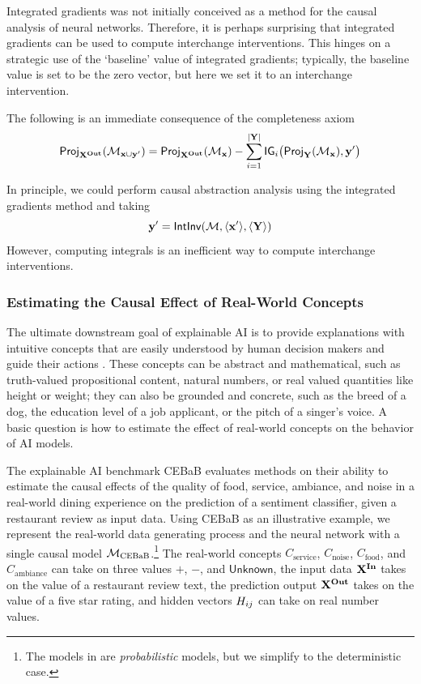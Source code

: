 \documentclass[twoside,11pt]{article}
\begin{document}
Integrated gradients was not initially conceived as a method for the causal analysis of neural networks. Therefore, it is perhaps surprising that integrated gradients can be used to compute interchange interventions. This hinges on a strategic use of the `baseline' value of integrated gradients; typically, the baseline value is set to be the zero vector, but here we set it to an interchange intervention. 
\begin{remark}

The following is an immediate consequence of the completeness axiom
\[\mathsf{Proj}_{ \mathbf{X}^{\mathbf{Out}}}(\mathcal{M}_{\mathbf{x} \cup \mathbf{y}'}) = \mathsf{Proj}_{\mathbf{X}^{\mathbf{Out}}}(\mathcal{M}_{\mathbf{x}}) - \sum_{i=1}^{|\mathbf{Y}|} \mathsf{IG}_i\big(\mathsf{Proj}_{ \mathbf{Y}}(\mathcal{M}_{\mathbf{x}}), \mathbf{y}'\big) \]
\end{remark}
In principle, we could perform causal abstraction analysis using the integrated gradients method and taking 
\[\mathbf{y}' = \mathsf{IntInv}(\mathcal{M}, \langle \mathbf{x}' \rangle, \langle \mathbf{Y}\rangle)\]
However, computing integrals is an inefficient way to compute interchange interventions.


\subsubsection{Estimating the Causal Effect of Real-World Concepts}

The ultimate downstream goal of explainable AI is to provide explanations with intuitive concepts \citep{Goyal, CausalLM, Elazar:2022, abraham-etal-2022-cebab} that are easily understood by human decision makers and guide their actions \citep{Karimi2021, Karimi2023,pmlr-v177-beckers22a}. These concepts can be abstract and mathematical, such as truth-valued propositional content, natural numbers, or real valued quantities like height or weight; they can also be grounded and concrete, such as the breed of a dog, the education level of a job applicant, or the pitch of a singer's voice. A basic question is how to estimate the effect of real-world concepts on the behavior of AI models.

The explainable AI benchmark CEBaB \citep{abraham-etal-2022-cebab} evaluates methods on their ability to estimate the causal effects of the quality of food, service, ambiance, and noise in a real-world dining experience on the prediction of a sentiment classifier, given a restaurant review as input data. Using CEBaB as an illustrative example, we represent the real-world data generating process and the neural network with a single causal model $\mathcal{M}_{\text{CEBaB}}$.\footnote{The models in \cite{abraham-etal-2022-cebab} are \textit{probabilistic} models, but we simplify to the deterministic case.}
The real-world concepts $C_{\text{service}}$, $C_{\text{noise}}$, $C_{\text{food}}$, and $C_{\text{ambiance}}$ can take on three values $+$, $-$, and $\textsf{Unknown}$, the input data $\mathbf{X}^{\mathbf{In}}$ takes on the value of a restaurant review text, the prediction output $\mathbf{X}^{\mathbf{Out}}$ takes on the value of a five star rating, and hidden vectors $H_{ij}$ can take on real number values. 
\end{document}
